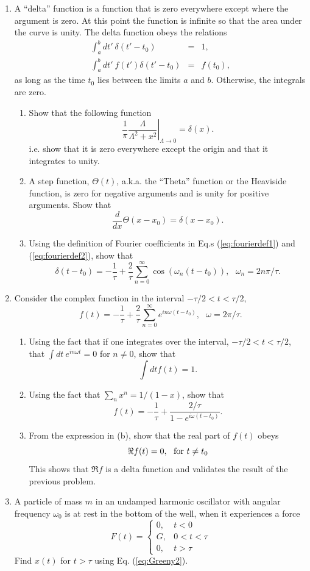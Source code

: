 \begin{enumerate}
\item A ``delta'' function is a function that is zero everywhere except where the argument is zero. At this point the function is infinite so that the area under the curve is unity. The delta function obeys the relations
\begin{eqnarray*}
\int_a^b dt'~ \delta(t'-t_0)&=&1,\\
\int_a^b dt'~ f(t')\delta(t'-t_0)&=&f(t_0),
\end{eqnarray*}
as long as the time $t_0$ lies between the limits $a$ and $b$. Otherwise, the integrals are zero.
\begin{enumerate}
\item Show that the following function
\[
\left.\frac{1}{\pi}\frac{\Lambda}{\Lambda^2+x^2}\right|_{\Lambda\rightarrow 0}=\delta(x).
\]
i.e. show that it is zero everywhere except the origin and that it integrates to unity.
\item A step function, $\Theta(t)$, a.k.a. the ``Theta'' function or the Heaviside function, is zero for negative arguments and is unity for positive arguments. Show that
\[
\frac{d}{dx}\Theta(x-x_0)=\delta(x-x_0).
\]
\item Using the definition of Fourier coefficients in Eq.s (\ref{eq:fourierdef1}) and (\ref{eq:fourierdef2}), show that
\[
\delta(t-t_0)=-\frac{1}{\tau}+\frac{2}{\tau}\sum_{n=0}^{\infty}\cos(\omega_n(t-t_0)),~~~\omega_n=2n\pi/\tau.
\]
\end{enumerate}

\item Consider the complex function in the interval $-\tau/2<t<\tau/2$,
\[
f(t)=-\frac{1}{\tau}+\frac{2}{\tau}\sum_{n=0}^\infty e^{in\omega(t-t_0)}, ~~~\omega=2\pi/\tau.
\]
\begin{enumerate}
\item Using the fact that if one integrates over the interval, $-\tau/2<t<\tau/2$, that $\int dt ~e^{in\omega t}=0$ for $n\ne 0$, show that
\[
\int dt f(t)=1.
\]
\item Using the fact that $\sum_n x^n=1/(1-x)$, show that 
\[
f(t)=-\frac{1}{\tau}+\frac{2/\tau}{1-e^{i\omega(t-t_0)}}.
\]
\item From the expression in (b), show that the real part of $f(t)$ obeys
\[
\Re f(t)=0,~~{\rm for}~t\ne t_0
\]
This shows that $\Re f$ is a delta function and validates the result of the previous problem.
\end{enumerate}

\item A particle of mass $m$ in an undamped harmonic oscillator with angular frequency $\omega_0$ is at rest in the bottom of the well, when it experiences a force
\[
F(t)=\left\{\begin{array}{rl}
0,&t<0\\
G,&0<t<\tau\\
0,&t>\tau\end{array}
\right.
\]
Find $x(t)$ for $t>\tau$ using Eq. (\ref{eq:Greeny2}).


\end{enumerate}
